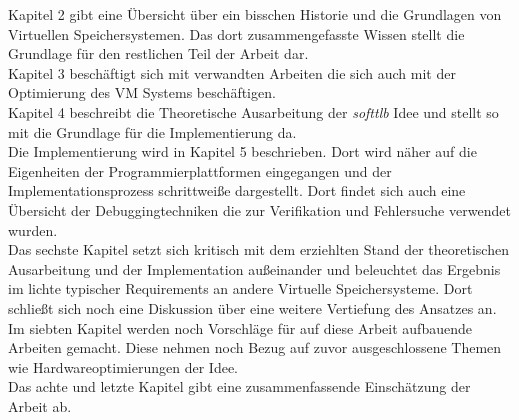



Kapitel 2 gibt eine Übersicht über ein bisschen Historie und die Grundlagen von Virtuellen
Speichersystemen. Das dort zusammengefasste Wissen stellt die Grundlage für den restlichen Teil der
Arbeit dar.\\
Kapitel 3 beschäftigt sich mit verwandten Arbeiten die sich auch mit der Optimierung des VM Systems
beschäftigen.\\
Kapitel 4 beschreibt die Theoretische Ausarbeitung der \textit{softtlb} Idee und stellt so mit die
Grundlage für die Implementierung da.\\
Die Implementierung wird in Kapitel 5 beschrieben. Dort wird näher auf die Eigenheiten der
Programmierplattformen eingegangen und der Implementationsprozess schrittweiße dargestellt.
Dort findet sich auch eine Übersicht der Debuggingtechniken die zur Verifikation und Fehlersuche
verwendet wurden.\\
Das sechste Kapitel setzt sich kritisch mit dem erziehlten Stand der theoretischen Ausarbeitung und
der Implementation außeinander und beleuchtet das Ergebnis im lichte typischer Requirements an
andere Virtuelle Speichersysteme. Dort schließt sich noch eine Diskussion über eine weitere
Vertiefung des Ansatzes an.\\
Im siebten Kapitel werden noch Vorschläge für auf diese Arbeit aufbauende Arbeiten gemacht. Diese
nehmen noch Bezug auf zuvor ausgeschlossene Themen wie Hardwareoptimierungen der Idee.\\
Das achte und letzte Kapitel gibt eine zusammenfassende Einschätzung der Arbeit ab.\\